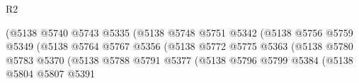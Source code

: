 \begin{lexlean}{R2}
\begin{coremodule}
                                                          (@5138
                                                            @5740
                                                            @5743
                                                            @5335
                                                            (@5138
                                                              @5748
                                                              @5751
                                                              @5342
                                                              (@5138
                                                                @5756
                                                                @5759
                                                                @5349
                                                                (@5138
                                                                  @5764
                                                                  @5767
                                                                  @5356
                                                                  (@5138
                                                                    @5772
                                                                    @5775
                                                                    @5363
                                                                    (@5138
                                                                      @5780
                                                                      @5783
                                                                      @5370
                                                                      (@5138
                                                                        @5788
                                                                        @5791
                                                                        @5377
                                                                        (@5138
                                                                          @5796
                                                                          @5799
                                                                          @5384
                                                                          (@5138
                                                                            @5804
                                                                            @5807
                                                                            @5391

\end{coremodule}
\end{lexlean}
